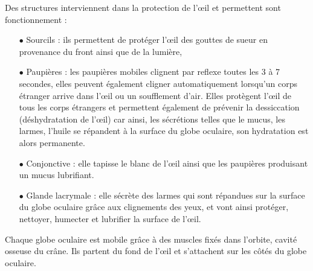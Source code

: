 \documentclass[a4paper, 12pt, onecolumn, openany]{report}
\begin{document}
    Des structures interviennent dans la protection de l’œil et permettent sont fonctionnement :
    \begin{itemize}
   	\item[$\bullet$] Sourcils : ils permettent de protéger l’œil des gouttes de sueur en provenance du front ainsi que de la lumière,
	\item[$\bullet$] Paupières : les paupières mobiles clignent par reflexe toutes les 3 à 7 secondes, elles peuvent également cligner automatiquement lorsqu’un corps étranger arrive dans l’œil ou un soufflement d’air.  Elles protègent l’œil de tous les corps étrangers et permettent également de prévenir la dessiccation (déshydratation de l’œil) car ainsi, les sécrétions telles que le mucus, les larmes, l’huile se répandent à la surface du globe oculaire, son hydratation est alors permanente.  
	\item[$\bullet$] Conjonctive : elle tapisse le blanc de l’œil ainsi que les paupières produisant un mucus lubrifiant.
	\item[$\bullet$] Glande lacrymale : elle sécrète des larmes qui sont répandues sur la surface du globe oculaire grâce aux clignements des yeux, et vont ainsi protéger, nettoyer, humecter et lubrifier la surface de l’œil.
	\end{itemize}	
	
	Chaque globe oculaire est mobile grâce à des muscles fixés dans l’orbite, cavité osseuse du crâne. Ils partent du fond de l’œil et s’attachent sur les côtés du globe oculaire. 
	
\end{document}
